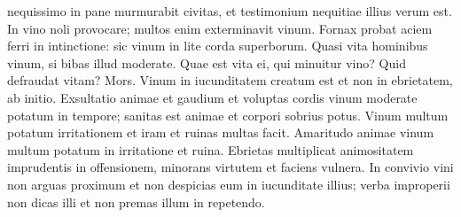 \begin{biblechapter}
\verse nequissimo in pane murmurabit civitas, et testimonium nequitiae illius verum est. 
\verse In vino noli provocare; multos enim exterminavit vinum. 
\verse Fornax probat aciem ferri in intinctione: sic vinum in lite corda superborum. 
\verse Quasi vita hominibus vinum, si bibas illud moderate. 
\verse Quae est vita ei, qui minuitur vino? 
\verse Quid defraudat vitam? Mors. 
\verse Vinum in iucunditatem creatum est et non in ebrietatem, ab initio. 
\verse Exsultatio animae et gaudium et voluptas cordis vinum moderate potatum in tempore; 
\verse sanitas est animae et corpori sobrius potus. 
\verse Vinum multum potatum irritationem et iram et ruinas multas facit. 
\verse Amaritudo animae vinum multum potatum in irritatione et ruina. 
\verse Ebrietas multiplicat animositatem imprudentis in offensionem, minorans virtutem et faciens vulnera. 
\verse In convivio vini non arguas proximum et non despicias eum in iucunditate illius; 
\verse verba improperii non dicas illi et non premas illum in repetendo. 
\end{biblechapter}

